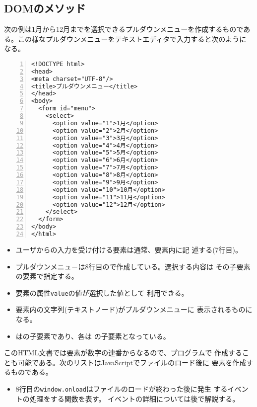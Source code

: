 \subsection{DOMのメソッド}

\begin{Exec}\upshape\label{PullDown}
 次の例は1月から12月までを選択できるプルダウンメニューを作成するものであ
 る。この様なプルダウンメニューをテキストエディタで入力すると次のように
 なる。\label{pulldown1}
\begin{Verbatim}[numbers=left]
<!DOCTYPE html>
<head>
<meta charset="UTF-8"/>
<title>プルダウンメニュー</title>
</head>
<body>
  <form id="menu">
    <select>
      <option value="1">1月</option>
      <option value="2">2月</option>
      <option value="3">3月</option>
      <option value="4">4月</option>
      <option value="5">5月</option>
      <option value="6">6月</option>
      <option value="7">7月</option>
      <option value="8">8月</option>
      <option value="9">9月</option>
      <option value="10">10月</option>
      <option value="11">11月</option>
      <option value="12">12月</option>
    </select>
  </form>
</body>
</html>
\end{Verbatim}
\begin{itemize}
 \item ユーザからの入力を受け付ける要素は通常、要素内に記
       述する(7行目)。
 \item プルダウンメニュ－は8行目ので作成している。選択する内容は
       その子要素の要素で指定する。
 \item {}要素の属性\texttt{value}の値が選択した値として
       利用できる。
 \item {}要素内の文字列(テキストノード)がプルダウンメニューに
       表示されるものになる。
 \item {}はの子要素であり、各は
       の子要素となっている。
\end{itemize}
 このHTML文書では要素が数字の連番からなるので、プログラムで
 作成することも可能である。次のリストはJavaScriptでファイルのロード後に
 要素を作成するものである。
\label{pulldown2}
\begin{itemize}
 \item 8行目の\texttt{window.onload}はファイルのロードが終わった後に発生
       するイベントの処理をする関数を表す。
       イベントの詳細については後で解説する。

\end{itemize}
\end{Exec}
